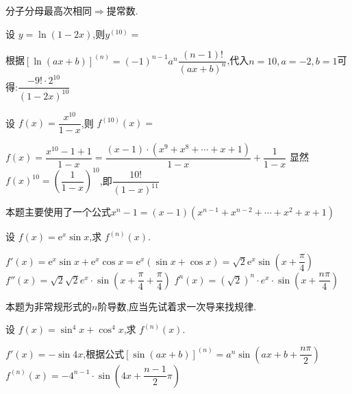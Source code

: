 \documentclass[8pt a4paper, oneside, UTF8]{ctexbook}  %
\begin{document}
\begin{sloppypar}
\begin{solution}
    \end{solution}
    \begin{note}
        分子分母最高次相同$\Longrightarrow$提常数.
    \end{note}
    \begin{problem}
    设 $y=\ln(1-2x)$,则$y^{(10)}=$
    \end{problem}
    \begin{solution}
        根据$\left[\ln(ax+b)\right]^{(n)}=(-1)^{n-1}a^{n}\dfrac{(n-1)!}{(ax+b)^{n}}$,代入$n=10,a=-2,b=1$可得:$\dfrac{-9!\cdot2^{10}}{(1-2x)^{10}}$
    \end{solution}
    \begin{problem}
    设 $f(x)=\dfrac{x^{10}}{1-x}$,则 $f^{(10)}(x)=$
    \end{problem}
    \begin{solution}
        $f(x)=\dfrac{x^{10}-1+1}{1-x}=\dfrac{(x-1)\cdot(x^{9}+x^{8}+\cdots+x+1)}{1-x}+\dfrac{1}{1-x}$
        \newline
        显然$f(x)^{10}=(\dfrac{1}{1-x})^{10}$,即$\dfrac{10!}{(1-x)^{11}}$
    \end{solution}
    \begin{note}
        本题主要使用了一个公式$x^{n}-1=(x-1)(x^{n-1}+x^{n-2}+\cdots+x^{2}+x+1)$
    \end{note}
    \begin{problem}
    设 $f(x)=\mathrm{e}^x\sin x$,求 $f^{(n)}(x)$.
    \end{problem}
    \begin{solution}
        $f'(x)=\mathrm{e}^x\sin x+\mathrm{e}^x\cos x=\mathrm{e}^x(\sin x+\cos x)=\sqrt{2}\mathrm{e}^x\sin(x+\dfrac{\pi}{4})$
        \newline
        $f''(x)=\sqrt{2} \sqrt{2} e^x \cdot \sin(x+\dfrac{\pi}{4}+\dfrac{\pi}{4})$
        \newline
        $f^{n}(x)=(\sqrt{2})^n\cdot e^x \cdot \sin(x+\dfrac{n\pi}{4})$
    \end{solution}
    \begin{note}
        本题为非常规形式的$n$阶导数,应当先试着求一次导来找规律.
    \end{note}
    \begin{problem}
    设 $f(x)=\sin^4x+\cos^4x$,求 $f^{(n)}(x)$.
    \end{problem}
    \begin{solution}
        $f'(x)=-\sin 4x$,根据公式$\left[\sin(ax+b)\right]^{(n)}=a^{n}\sin\left(ax+b+\dfrac{n\pi}{2}\right)$
        \newline
        $f^{(n)}(x)=-4^{n-1} \cdot \sin(4x+\dfrac{n-1}{2}\pi)$
    \end{solution}

\end{sloppypar}
\end{document}
